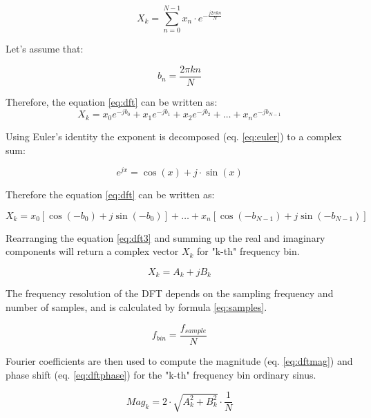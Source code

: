 \begin{equation} \label{eq:dft}
X_k = \sum_{n=0}^{N-1} x_n \cdot e^{-\frac{j2 \pi kn}{N}}
\end{equation}

Let's assume that:

\begin{equation} \label{eq:bn}
b_n = \frac{2 \pi k n}{N}
\end{equation}

Therefore, the equation \ref{eq:dft} can be written as:
\begin{equation} \label{eq:dft2}
X_k = x_{0} e^{-j b_{0}} + x_{1} e^{-j b_{1}} + x_{2} e^{-j b_{2}} + \ldots + x_{n} e^{-j b_{N-1}}
\end{equation}

Using Euler's identity the exponent is decomposed (eq. \ref{eq:euler}) to a complex sum:

\begin{equation} \label{eq:euler}
e^{jx} = \cos(x) + j \cdot \sin(x)
\end{equation}

Therefore the equation \ref{eq:dft} can be written as:

\begin{equation} \label{eq:dft3}
X_k = x_0 [\cos(-b_{0}) + j \sin(-b_{0})] +  \ldots + x_n [\cos(-b_{N-1}) + j \sin(-b_{N-1})]
\end{equation}

Rearranging the equation \ref{eq:dft3} and summing up the real and imaginary components will return a complex vector $X_k$ for "k-th" frequency bin.

\begin{equation} \label{eq:complex}
X_k = A_k + j B_{k}
\end{equation}
 
The frequency resolution of the DFT depends on the sampling frequency and number of samples, and is calculated by formula \ref{eq:samples}. 

\begin{equation} \label{eq:samples}
f_{bin} = \frac{f_{sample}}{N}
\end{equation}

Fourier coefficients are then used to compute the magnitude (eq. \ref{eq:dftmag}) and phase shift (eq. \ref{eq:dftphase}) for the "k-th" frequency bin ordinary sinus.

\begin{equation} \label{eq:dftmag}
Mag_k = 2 \cdot \sqrt{A_{k}^{2} + B_{k}^{2}} \cdot \frac{1}{N}
\end{equation}

